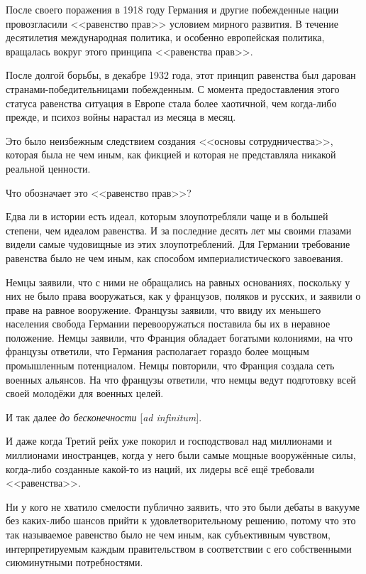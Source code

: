 После своего поражения в 1918 году Германия и другие побежденные нации провозгласили <<равенство прав>> условием мирного развития. В течение десятилетия международная политика, и особенно европейская политика, вращалась вокруг этого принципа <<равенства прав>>.

После долгой борьбы, в декабре 1932 года, этот принцип равенства был дарован странами-победительницами побежденным. С момента предоставления этого статуса равенства ситуация в Европе стала более хаотичной, чем когда-либо прежде, и психоз войны нарастал из месяца в месяц.

Это было неизбежным следствием создания <<основы сотрудничества>>, которая была не чем иным, как фикцией и которая не представляла никакой реальной ценности.

Что обозначает это <<равенство прав>>?

Едва ли в истории есть идеал, которым злоупотребляли чаще и в большей степени, чем идеалом равенства. И за последние десять лет мы своими глазами видели самые чудовищные из этих злоупотреблений. Для Германии требование равенства было не чем иным, как способом империалистического завоевания.

Немцы заявили, что с ними не обращались на равных основаниях, поскольку у них не было права вооружаться, как у французов, поляков и русских, и заявили о праве на равное вооружение. Французы заявили, что ввиду их меньшего населения свобода Германии перевооружаться поставила бы их в неравное положение. Немцы заявили, что Франция обладает богатыми колониями, на что французы ответили, что Германия располагает гораздо более мощным промышленным потенциалом. Немцы повторили, что Франция создала сеть военных альянсов. На что французы ответили, что немцы ведут подготовку всей своей молодёжи для военных целей.

И так далее \textit{до бесконечности} [\textit{ad infinitum}].

И даже когда Третий рейх уже покорил и господствовал над миллионами и миллионами иностранцев, когда у него были самые мощные вооружённые силы, когда-либо созданные какой-то из наций, их лидеры всё ещё требовали <<равенства>>.

Ни у кого не хватило смелости публично заявить, что это были дебаты в вакууме без каких-либо шансов прийти к удовлетворительному решению, потому что это так называемое равенство было не чем иным, как субъективным чувством, интерпретируемым каждым правительством в соответствии с его собственными сиюминутными потребностями.

